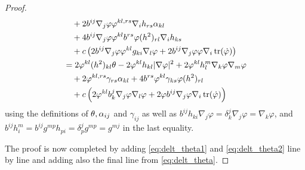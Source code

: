 \documentclass{amsart}
\begin{document}
\begin{proof}
\begin{equation}
\begin{split}
&\quad + 2 b^{ij} \nabla_j\varphi \varphi^{kl,rs}\nabla_i h_{rs} \alpha_{kl} \\
&\quad + 4 b^{ij} \nabla_j\varphi \varphi^{kl} b^{rs} \varphi(h^2)_{rl} \nabla_i h_{ks} \\
&\quad + c\left(2 b^{ij} \nabla_j\varphi \varphi^{kl}g_{ki} \nabla_l \varphi + 2 b^{ij} \nabla_j\varphi \varphi \nabla_i \operatorname{tr}(\dot{\varphi})\right) \\
&= 2 \varphi^{kl}(h^2)_{kl}\theta - 2 \varphi^{kl}h_{kl} |\nabla\varphi|^2 + 2 \varphi^{kl} h^{m}_{l} \nabla_k\varphi \nabla_m \varphi \\
&\quad + 2 \varphi^{kl,rs} \gamma_{rs} \alpha_{kl} + 4 b^{rs} \varphi^{kl} \gamma_{ks} \varphi(h^2)_{rl} \\
&\quad + c\left(2 \varphi^{kl} b^j_k \nabla_j\varphi \nabla_l \varphi + 2 \varphi b^{ij} \nabla_j\varphi \nabla_i \operatorname{tr}(\dot{\varphi})\right)
\end{split}
\end{equation}
using the definitions of \(\theta, \alpha_{ij}\) and \(\gamma_{ij}\) as well as \(b^{ij}h_{ki} \nabla_j \varphi = \delta^j_k \nabla_j \varphi = \nabla_k \varphi\), and \(b^{ij} h^m_i = b^{ij} g^{mp}h_{pi} = \delta^j_p g^{mp} = g^{mj}\) in the last equality.

The proof is now completed by adding \cref{eq:delt_theta1} and \cref{eq:delt_theta2} line by line and adding also the final line from \cref{eq:delt_theta}.
\end{proof}
\end{document}
